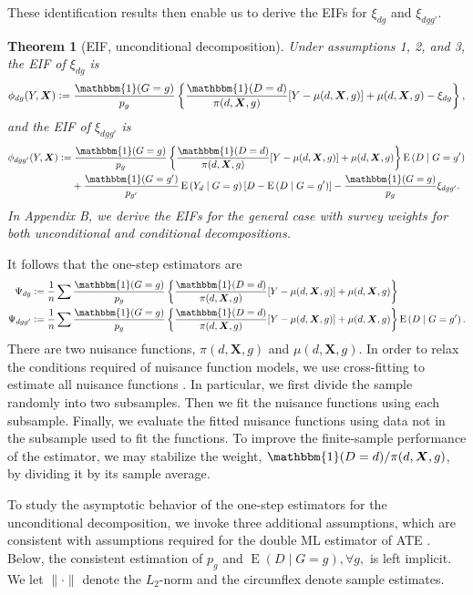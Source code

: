 \documentclass[12pt,a4paper]{article}
\newtheorem{prop}{Theorem}
\newcommand{\E}{\operatorname{E}}
\def\X{{\boldsymbol X}}
\def\one{\mathbbm{1}}
\newcommand{\defeq}{\vcentcolon=}
\begin{document}
These identification results then enable us to derive the EIFs for $\xi_{dg}$ and $\xi_{dgg'}$.
\begin{prop}[EIF, unconditional decomposition]
Under assumptions 1, 2, and 3, the EIF of $\xi_{dg}$ is
$$\phi_{dg}(Y,\X) \defeq \frac{\one(G=g)}{p_g} \left\{ \frac{\one(D=d)}{\pi(d, \X,g)} [Y-\mu(d,\X,g)] + \mu(d,\X,g) - \xi_{dg} \right\},$$ 
and the EIF of $\xi_{dgg'}$ is
\begin{align*}
    \phi_{dgg'}(Y,\X) &\defeq \frac{\one(G=g)}{p_g}  \left\{\frac{\one(D=d)}{\pi(d,\X,g)}[Y-\mu(d,\X,g)] + \mu(d,\X,g) \right\} \E \left(D \mid G=g' \right) \\
    &\phantom{{}={}} + \frac{\one(G=g')}{p_{g'}} \E \left(Y_d \mid G=g \right) \left[D - \E \left(D \mid G=g' \right) \right] - \frac{\one(G=g)}{p_g} \xi_{dgg'}.
\end{align*}
In Appendix B, we derive the EIFs for the general case with survey weights for both unconditional and conditional decompositions. 
\end{prop}
It follows that the one-step estimators are
\begin{align*}
    \Psi_{dg} &\defeq \frac{1}{n} \sum \frac{\one(G=g)}{p_g} \left\{ \frac{\one(D=d)}{\pi(d, \X,g)} [Y-\mu(d,\X,g)] + \mu(d,\X,g)\right\} \\
    \Psi_{dgg'} &\defeq \frac{1}{n} \sum \frac{\one(G=g)}{p_g}  \left\{\frac{\one(D=d)}{\pi(d,\X,g)}[Y-\mu(d,\X,g)] + \mu(d,\X,g) \right\} \E \left(D \mid G=g' \right).
\end{align*}
There are two nuisance functions, $\pi(d,\X,g)$ and $\mu(d,\X,g)$. In order to relax the conditions required of nuisance function models, we use cross-fitting to estimate all nuisance functions \citep{kennedy_semiparametric_2022, chernozhukov_double/debiased_2018}. In particular, we first divide the sample randomly into two subsamples. Then we fit the nuisance functions using each subsample. Finally, we evaluate the fitted nuisance functions using data not in the subsample used to fit the functions. To improve the finite-sample performance of the estimator, we may stabilize the weight, $\one(D=d)/\pi(d,\X,g)$, by dividing it by its sample average.  

To study the asymptotic behavior of the one-step estimators for the unconditional decomposition, we invoke three additional assumptions, which are consistent with assumptions required for the double ML estimator of ATE \citep{kennedy_semiparametric_2022, chernozhukov_double/debiased_2018}. Below, the consistent estimation of $p_g$ and $\E(D \mid G=g), \forall g,$ is left implicit. We let $\| \cdot \|$ denote the $L_2$-norm and the circumflex denote sample estimates. 
\end{document}
